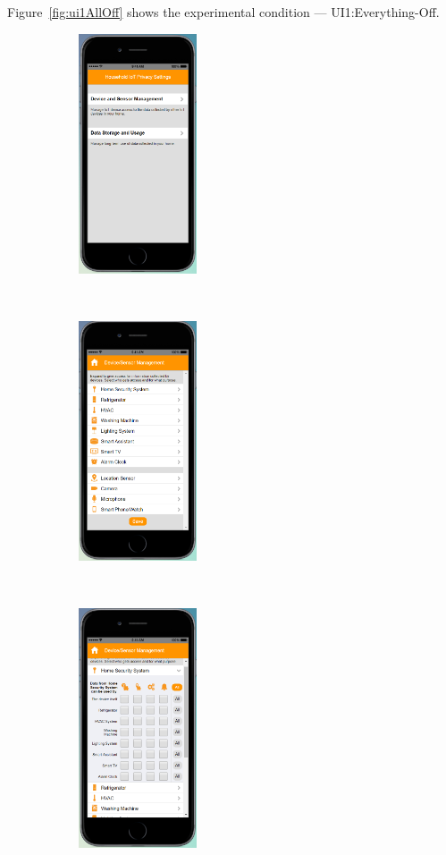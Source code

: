\begin{appendices}
Figure~\ref{fig:ui1AllOff} shows the experimental condition --- UI1:Everything-Off.
\begin{figure}
	\centering
	\begin{subfigure}[t]{0.24\textwidth}
		\centering
		\includegraphics[height=2.8in]{figures/ui1allOff1.png}
	\end{subfigure}%
	~
	\begin{subfigure}[t]{0.24\textwidth}
		\centering
		\includegraphics[height=2.8in]{figures/ui1allOff2.png}
	\end{subfigure}%
	~
	\begin{subfigure}[t]{0.24\textwidth}
		\centering
		\includegraphics[height=2.8in]{figures/ui2allOff3.png}

\end{subfigure}
\end{figure}
\end{appendices}
